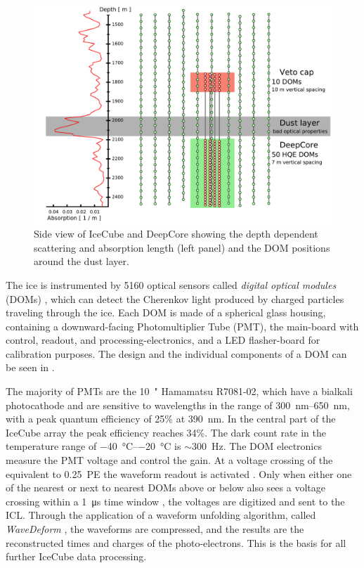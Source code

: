 \begin{figure}[h]
    \includegraphics{figures/icecube_deepcore/DeepCore_sideview.pdf}
	\caption[IceCube side view]{Side view of IceCube and DeepCore showing the depth dependent scattering and absorption length (left panel) and the DOM positions around the dust layer.}
\end{figure}


The ice is instrumented by 5160 optical sensors called \textit{digital optical modules} (DOMs) , which can detect the Cherenkov light produced by charged particles traveling through the ice. Each DOM is made of a spherical glass housing, containing a downward-facing Photomultiplier Tube (PMT), the main-board with control, readout, and processing-electronics, and a LED flasher-board for calibration purposes. The design and the individual components of a DOM can be seen in .

The majority of PMTs are the \SI{10}{"} Hamamatsu R7081-02, which have a bialkali photocathode and are sensitive to wavelengths in the range of \SIrange{300}{650}{\nano\meter}, with a peak quantum efficiency of 25\% at \SI{390}{\nano\meter}. In the central part of the IceCube array the peak efficiency reaches 34\%. The dark count rate in the temperature range of \SIrange{-40}{-20}{\degreeCelsius} is $\sim$\SI{300}{\hertz}. The DOM electronics measure the PMT voltage and control the gain. At a voltage crossing of the equivalent to \SI{0.25}{PE} the waveform readout is activated . Only when either one of the nearest or next to nearest DOMs above or below also sees a voltage crossing within a \SI{1}{\micro\second} time window , the voltages are digitized and sent to the ICL. Through the application of a waveform unfolding algorithm, called \textit{WaveDeform} , the waveforms are compressed, and the results are the reconstructed times and charges of the photo-electrons. This is the basis for all further IceCube data processing.

